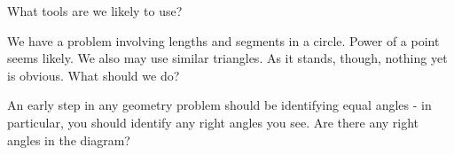 What tools are we likely to use?










We have a problem involving lengths and segments in a circle. Power of a point seems likely. We also may use similar triangles. As it stands, though, nothing yet is obvious. What should we do?


An early step in any geometry problem should be identifying equal angles - in particular, you should identify any right angles you see. Are there any right angles in the diagram?








